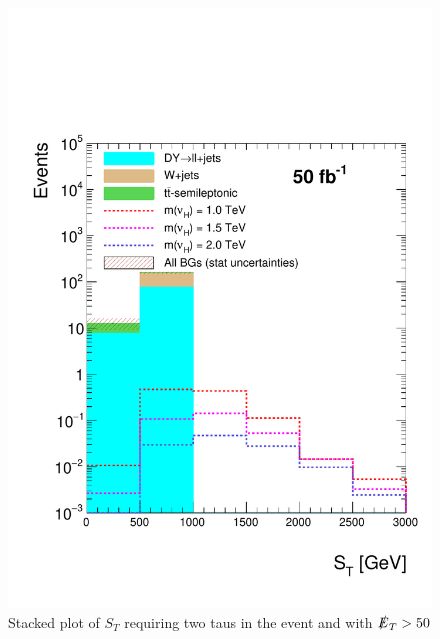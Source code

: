 \begin{figure}[htbp!]
\centering
\includegraphics[width=0.9\linewidth]{StackPlots/ST_2taus_met50_50ifb.pdf}
\caption{Stacked plot of $S_{T}$ requiring two taus in the event and with $\slashed{E}_{T} > 50$}
\label{fig: ST2tausMet50}
\end{figure}


